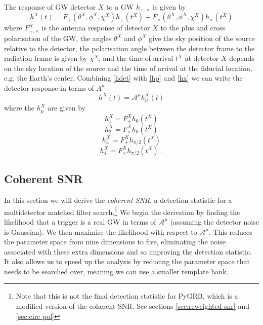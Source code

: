 \documentclass[11pt]{cuthesis}
\begin{document}
The response of GW detector $X$ to a GW $h_{+,\times}$ is given by
\begin{equation} \label{hdet}
h^X(t) = F_+(\theta^X,\phi^X,\chi^X) h_+(t^X) + F_\times(\theta^X,\phi^X,\chi^X) h_\times (t^X)
\end{equation}
where $F_{+,\times}^X$ is the antenna response of detector $X$ to the plus and cross polarisation of the GW, the angles $\theta^X$ and $\phi^X$ give the sky position of the source relative to the detector, the polarisation angle between the detector frame to the radiation frame is given by $\chi^X$, and the time of arrival $t^X$ at detector $X$ depends on the sky location of the source and the time of arrival at the fiducial location, e.g. the Earth's center. Combining \ref{hdet} with \ref{hp} and \ref{hx} we can write the detector response in terms of $A^\mu$
\begin{equation} \label{h in A}
h^X(t) = \mathcal{A}^\mu h_\mu^X(t) 
\end{equation}
where the $h_\mu^X$ are given by
\begin{equation}
h_1^X = F_+^X h_0(t^X) 
\end{equation}
\begin{equation}
h_2^X = F_\times^X h_0(t^X) 
\end{equation}
\begin{equation}
h_3^X = F_+^X h_{\pi/2}(t^X) 
\end{equation}
\begin{equation}
h_4^X = F_\times^X h_{\pi/2}(t^X) \textbf{ .} 
\end{equation}

\subsection{Coherent SNR} \label{sec:coh snr}
In this section we will derive the \textit{coherent SNR}, a detection statistic for a multidetector matched filter search.\footnote{Note that this is not the final detection statistic for PyGRB, which is a modified version of the coherent SNR. See sections \ref{sec:reweighted snr} and \ref{sec:circ pol}} We begin the derivation by finding the likelihood that a trigger is a real GW in terms of $\mathcal{A}^\mu$ (assuming the detector noise is Gaussian). We then maximise the likelihood with respect to $\mathcal{A}^\mu$. This reduces the parameter space from nine dimensions to five, eliminating the noise associated with these extra dimensions and so improving the detection statistic. It also allows us to speed up the analysis by reducing the parameter space that needs to be searched over, meaning we can use a smaller template bank.
\end{document}
